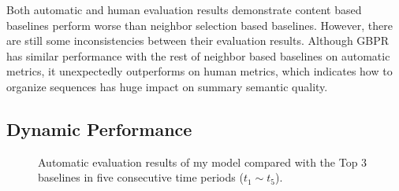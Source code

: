 Both automatic and human evaluation results demonstrate content based baselines perform worse than neighbor selection based baselines. However, there are still some inconsistencies between their evaluation results. Although GBPR has similar performance with the rest of neighbor based baselines on automatic metrics, it unexpectedly outperforms on human metrics, which indicates how to organize sequences has huge impact on summary semantic quality.

\subsection{Dynamic Performance} 
\begin{figure} 
	\centering 
	\caption{Automatic evaluation results of my model compared with the Top 3 baselines in five consecutive time periods ($t_1 \sim t_5$).} 
	\label{fig:auto-eval} 
\end{figure}
